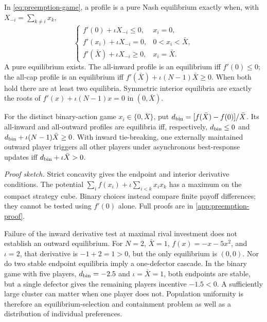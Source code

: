 \begin{proposition}
\label{prop:preemption}
In \cref{eq:preemption-game}, a profile is a pure Nash equilibrium exactly
when, with $X_{-i}=\sum_{k\ne i}x_k$,
\begin{equation}
 \begin{cases}
 f'(0)+\iota X_{-i}\leq0,&x_i=0,\\
 f'(x_i)+\iota X_{-i}=0,&0<x_i<\bar X,\\
 f'(\bar X)+\iota X_{-i}\geq0,&x_i=\bar X.
 \end{cases}
 \label{eq:preemption-KKT}
\end{equation}
A pure equilibrium exists. The all-inward profile is an equilibrium iff
$f'(0)\leq0$; the all-cap profile is an equilibrium iff
$f'(\bar X)+\iota(N-1)\bar X\geq0$. When both hold there are at least
two equilibria. Symmetric interior equilibria are exactly the roots of
$f'(x)+\iota(N-1)x=0$ in $(0,\bar X)$.

For the distinct binary-action game $x_i\in\{0,\bar X\}$, put
$d_{\rm bin}=[f(\bar X)-f(0)]/\bar X$. Its all-inward and all-outward
profiles are equilibria iff, respectively,
$d_{\rm bin}\leq0$ and $d_{\rm bin}+\iota(N-1)\bar X\geq0$.
With inward tie-breaking, one externally maintained outward player
triggers all other players under asynchronous best-response updates
iff $d_{\rm bin}+\iota\bar X>0$.
\end{proposition}
\noindent\emph{Proof sketch.}
Strict concavity gives the endpoint and interior derivative conditions.
The potential $\sum_i f(x_i)+\iota\sum_{i<k}x_ix_k$ has a maximum on
the compact strategy cube. Binary choices instead compare finite payoff
differences; they cannot be tested using $f'(0)$ alone. Full proofs are
in \cref{app:preemption-proof}.

Failure of the inward derivative test at maximal rival investment does
not establish an outward equilibrium. For $N=2$, $\bar X=1$,
$f(x)=-x-5x^2$, and $\iota=2$, that derivative is $-1+2=1>0$,
but the only equilibrium is $(0,0)$. Nor do two stable endpoint
equilibria imply a one-defector cascade. In the binary game with five
players, $d_{\rm bin}=-2.5$ and $\iota=\bar X=1$, both endpoints are
stable, but a single defector gives the remaining players incentive
$-1.5<0$. A sufficiently large cluster can matter when one player does
not. Population uniformity is therefore an equilibrium-selection and
containment problem as well as a distribution of individual preferences.

